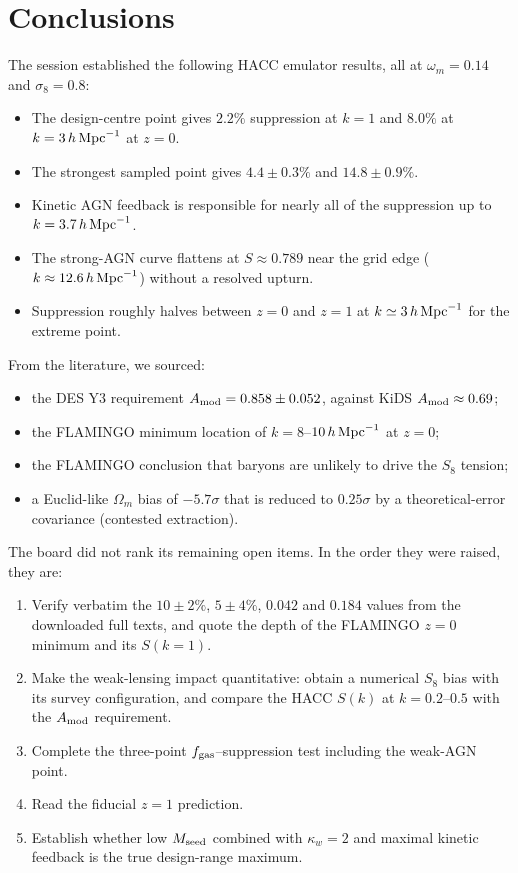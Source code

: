 \documentclass[11pt,a4paper]{article}
\begin{document}
\section{Conclusions}
The session established the following HACC emulator results, all at $\omega_m=0.14$ and $\sigma_8=0.8$:
\begin{itemize}
\item The design-centre point gives $2.2\%$ suppression at $k=1$ and $8.0\%$ at $k=3\,h\,{\rm Mpc}^{-1}$ at $z=0$.
\item The strongest sampled point gives $4.4\pm0.3\%$ and $14.8\pm0.9\%$.
\item Kinetic AGN feedback is responsible for nearly all of the suppression up to $k=3.7\,h\,{\rm Mpc}^{-1}$.
\item The strong-AGN curve flattens at $S\approx0.789$ near the grid edge ($k\approx12.6\,h\,{\rm Mpc}^{-1}$) without a resolved upturn.
\item Suppression roughly halves between $z=0$ and $z=1$ at $k\simeq3\,h\,{\rm Mpc}^{-1}$ for the extreme point.
\end{itemize}

From the literature, we sourced:
\begin{itemize}
\item the DES Y3 requirement $A_{\rm mod}=0.858\pm0.052$, against KiDS $A_{\rm mod}\approx0.69$;
\item the FLAMINGO minimum location of $k=8$--$10\,h\,{\rm Mpc}^{-1}$ at $z=0$;
\item the FLAMINGO conclusion that baryons are unlikely to drive the $S_8$ tension;
\item a Euclid-like $\Omega_m$ bias of $-5.7\sigma$ that is reduced to $0.25\sigma$ by a theoretical-error covariance (contested extraction).
\end{itemize}

The board did not rank its remaining open items. In the order they were raised, they are:
\begin{enumerate}
\item Verify verbatim the $10\pm2\%$, $5\pm4\%$, $0.042$ and $0.184$ values from the downloaded full texts, and quote the depth of the FLAMINGO $z=0$ minimum and its $S(k=1)$.
\item Make the weak-lensing impact quantitative: obtain a numerical $S_8$ bias with its survey configuration, and compare the HACC $S(k)$ at $k=0.2$--$0.5$ with the $A_{\rm mod}$ requirement.
\item Complete the three-point $f_{\rm gas}$--suppression test including the weak-AGN point.
\item Read the fiducial $z=1$ prediction.
\item Establish whether low $M_{\rm seed}$ combined with $\kappa_w=2$ and maximal kinetic feedback is the true design-range maximum.
\end{enumerate}
\end{document}
